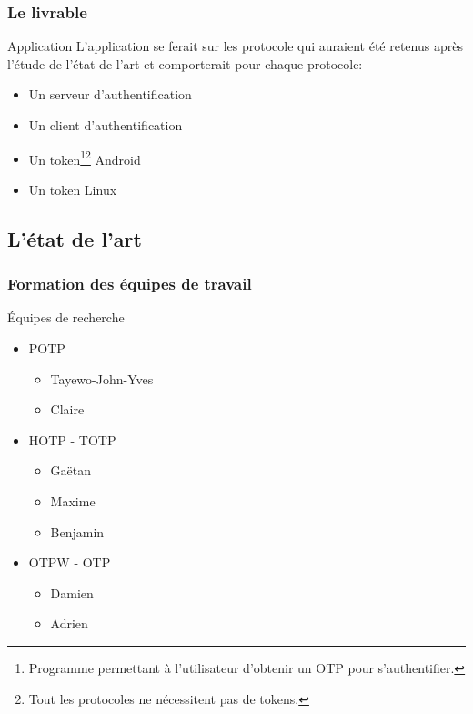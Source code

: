 \documentclass[xcolor=table]{beamer}
\begin{document}
\begin{frame}
\frametitle{Le livrable}
\begin{block}{Application}
    L'application se ferait sur les protocole qui auraient été retenus après l'étude de 
  l'état de l'art et comporterait pour chaque protocole:
  \begin{itemize}
    \item Un serveur d'authentification
    \item Un client d'authentification
    \item Un token\footnote[1]{Programme permettant à l'utilisateur d'obtenir un 
      OTP pour s'authentifier.}\footnote[2]{Tout les protocoles ne 
      nécessitent pas de tokens.} Android
    \item Un token Linux
  \end{itemize}
\end{block}

\end{frame}

\subsection{L'état de l'art}
\begin{frame}
\frametitle{Formation des équipes de travail}
\begin{block}{Équipes de recherche}
  \begin{itemize}
    \item POTP
    \begin{itemize}
      \item Tayewo-John-Yves 
      \item Claire 
    \end{itemize}
    \item HOTP - TOTP
    \begin{itemize}
      \item Gaëtan 
      \item Maxime 
      \item Benjamin 
    \end{itemize}
    \item OTPW - OTP
    \begin{itemize}
      \item Damien 
      \item Adrien 
    \end{itemize}
  \end{itemize}
\end{block}
\end{frame}
\end{document}
